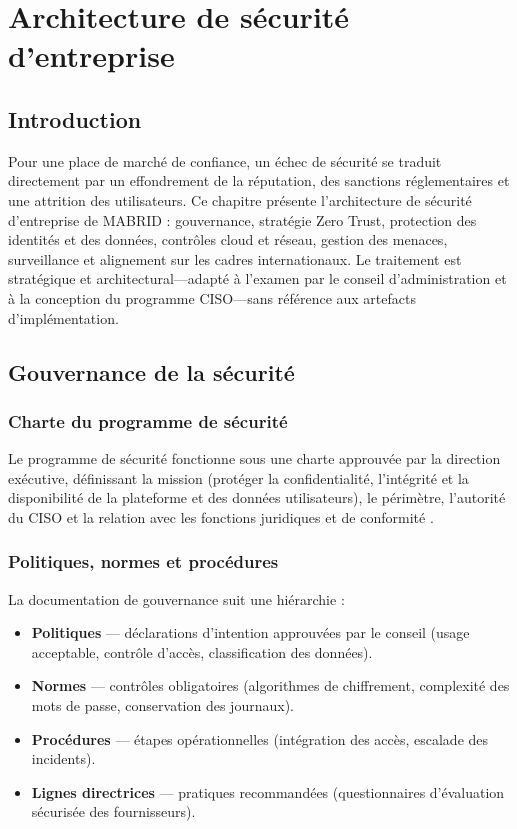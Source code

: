 \chapter{Architecture de sécurité d'entreprise}
\label{ch:security}

\section{Introduction}

Pour une place de marché de confiance, un échec de sécurité se traduit directement par un effondrement de la réputation, des sanctions réglementaires et une attrition des utilisateurs. Ce chapitre présente l'architecture de sécurité d'entreprise de MABRID : gouvernance, stratégie Zero Trust, protection des identités et des données, contrôles cloud et réseau, gestion des menaces, surveillance et alignement sur les cadres internationaux. Le traitement est stratégique et architectural---adapté à l'examen par le conseil d'administration et à la conception du programme CISO---sans référence aux artefacts d'implémentation.

\section{Gouvernance de la sécurité}

\subsection{Charte du programme de sécurité}

Le programme de sécurité fonctionne sous une charte approuvée par la direction exécutive, définissant la mission (protéger la confidentialité, l'intégrité et la disponibilité de la plateforme et des données utilisateurs), le périmètre, l'autorité du CISO et la relation avec les fonctions juridiques et de conformité \parencite{nist80039}.

\subsection{Politiques, normes et procédures}

La documentation de gouvernance suit une hiérarchie :
\begin{itemize}
  \item \textbf{Politiques} --- déclarations d'intention approuvées par le conseil (usage acceptable, contrôle d'accès, classification des données).
  \item \textbf{Normes} --- contrôles obligatoires (algorithmes de chiffrement, complexité des mots de passe, conservation des journaux).
  \item \textbf{Procédures} --- étapes opérationnelles (intégration des accès, escalade des incidents).
  \item \textbf{Lignes directrices} --- pratiques recommandées (questionnaires d'évaluation sécurisée des fournisseurs).
\end{itemize}

